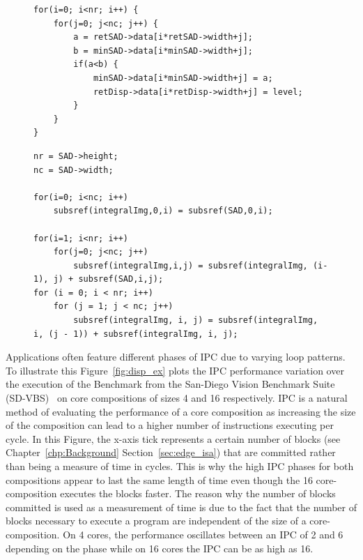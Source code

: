 \begin{figure}[t]
\lstset{language=C,numbersep=4pt}
\begin{center}
\begin{lstlisting}
for(i=0; i<nr; i++) {
	for(j=0; j<nc; j++) {
		a = retSAD->data[i*retSAD->width+j];
		b = minSAD->data[i*minSAD->width+j];
		if(a<b) {
			minSAD->data[i*minSAD->width+j] = a;
			retDisp->data[i*retDisp->width+j] = level;
		}
	}
}

\end{lstlisting}
\end{center}
\vspace{-1em}
\label{lst:low_ipc}
\end{figure}

\begin{figure}[t]
\lstset{language=C,numbersep=4pt}
\begin{center}
\begin{lstlisting}
nr = SAD->height;
nc = SAD->width;

for(i=0; i<nc; i++)
	subsref(integralImg,0,i) = subsref(SAD,0,i);

for(i=1; i<nr; i++)
	for(j=0; j<nc; j++) 
		subsref(integralImg,i,j) = subsref(integralImg, (i-1), j) + subsref(SAD,i,j);
for (i = 0; i < nr; i++)
	for (j = 1; j < nc; j++)
		subsref(integralImg, i, j) = subsref(integralImg, i, (j - 1)) + subsref(integralImg, i, j);

\end{lstlisting}
\end{center}
\vspace{-2em}
\label{lst:high_ipc}
\end{figure}

Applications often feature different phases of IPC due to varying loop patterns.
To illustrate this Figure~\ref{fig:disp_ex} plots the IPC performance variation over the execution of the  Benchmark from the San-Diego Vision Benchmark Suite (SD-VBS)~\cite{sdvbs} on core compositions of sizes 4 and 16 respectively.
IPC is a natural method of evaluating the performance of a core composition as increasing the size of the composition can lead to a higher number of instructions executing per cycle.
In this Figure, the x-axis tick represents a certain number of blocks (see Chapter~\ref{chp:Background} Section~\ref{sec:edge_isa}) that are committed rather than being a measure of time in cycles.
This is why the high IPC phases for both compositions appear to last the same length of time even though the 16 core-composition executes the blocks faster.
The reason why the number of blocks committed is used as a measurement of time is due to the fact that the number of blocks necessary to execute a program are independent of the size of a core-composition.
On 4 cores, the performance oscillates between an IPC of 2 and 6 depending on the phase while on 16 cores the IPC can be as high as 16.

